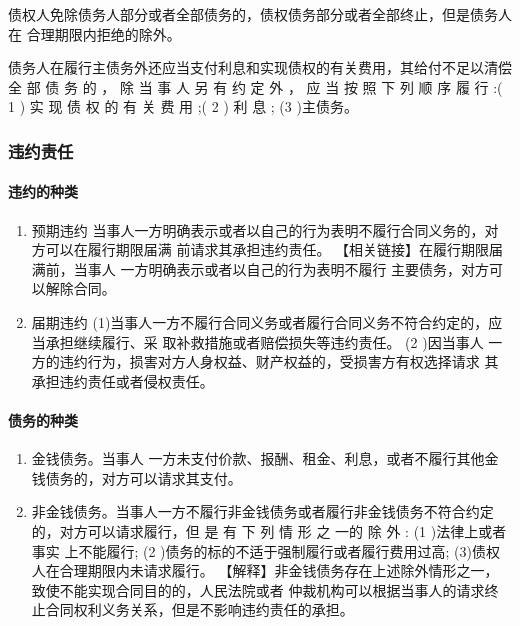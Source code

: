 \documentclass[UTF8,12pt]{ctexart}
\numberwithin{equation}{section} %
\numberwithin{figure}{section}
\numberwithin{table}{section}
\begin{document}
	债权人免除债务人部分或者全部债务的，债权债务部分或者全部终止，但是债务人在 合理期限内拒绝的除外。
	
	债务人在履行主债务外还应当支付利息和实现债权的有关费用，其给付不足以清偿全 部 债 务 的 ， 除 当 事 人 另 有 约 定 外 ， 应 当 按 照 下 列 顺 序 履 行 :( 1 ) 实 现 债 权 的 有 关 费 用 ;( 2 ) 利 息 ; (3 )主债务。
	
	\subsubsection{违约责任}
	
	\paragraph{违约的种类}
	\begin{enumerate}
		\item 预期违约 当事人一方明确表示或者以自己的行为表明不履行合同义务的，对方可以在履行期限届满 前请求其承担违约责任。
		【相关链接】在履行期限届满前，当事人 一方明确表示或者以自己的行为表明不履行 主要债务，对方可以解除合同。
		
		\item 届期违约 (1)当事人一方不履行合同义务或者履行合同义务不符合约定的，应当承担继续履行、采 取补救措施或者赔偿损失等违约责任。
		(2 )因当事人 一方的违约行为，损害对方人身权益、财产权益的，受损害方有权选择请求 其承担违约责任或者侵权责任。
		
	\end{enumerate}
	
	
	\paragraph{债务的种类}
	
	\begin{enumerate}
		\item 金钱债务。当事人 一方未支付价款、报酬、租金、利息，或者不履行其他金钱债务的，对方可以请求其支付。 
		
		\item 非金钱债务。当事人一方不履行非金钱债务或者履行非金钱债务不符合约定的，对方可以请求履行，但 是 有 下 列 情 形 之 一的 除 外 :
		(1 )法律上或者事实 上不能履行;
		(2 )债务的标的不适于强制履行或者履行费用过高; (3)债权人在合理期限内未请求履行。
		【解释】非金钱债务存在上述除外情形之一，致使不能实现合同目的的，人民法院或者 仲裁机构可以根据当事人的请求终止合同权利义务关系，但是不影响违约责任的承担。
	\end{enumerate}
	
\end{document}
